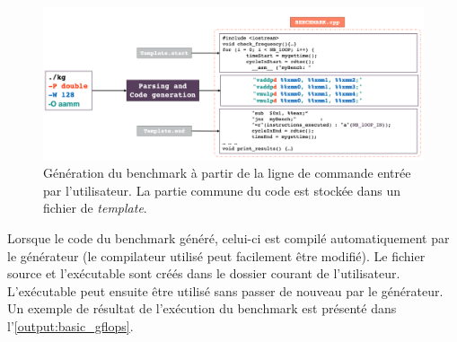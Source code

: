         \begin{figure}[h!]
            \center
            \includegraphics[width=16cm]{images/kg_generation.png}
            \caption{\label{pic_kg_generation}Génération du benchmark à partir de la ligne de commande entrée par l'utilisateur. La partie commune du code est stockée dans un fichier de \textit{template}.}
        \end{figure}
        
        Lorsque le code du benchmark généré, celui-ci est compilé automatiquement par le générateur (le compilateur utilisé peut facilement être modifié). Le fichier source et l'exécutable sont créés dans le dossier courant de l'utilisateur. L'exécutable peut ensuite être utilisé sans passer de nouveau par le générateur. Un exemple de résultat de l'exécution du benchmark est présenté dans l'\autoref{output:basic_gflops}.
    

